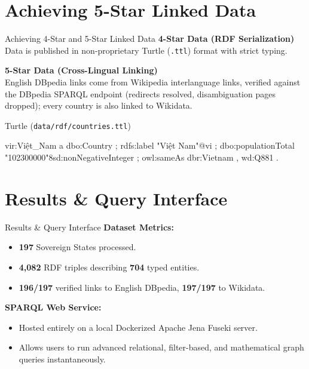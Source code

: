 \documentclass[aspectratio=169]{beamer}
\begin{document}
\section{Achieving 5-Star Linked Data}
\begin{frame}[fragile]{Achieving 4-Star and 5-Star Linked Data}
    \textbf{4-Star Data (RDF Serialization)} \\
    Data is published in non-proprietary Turtle (\texttt{.ttl}) format with strict typing.
    
    \vspace{0.3cm}
    \textbf{5-Star Data (Cross-Lingual Linking)} \\
    English DBpedia links come from Wikipedia interlanguage links, verified against the DBpedia SPARQL endpoint (redirects resolved, disambiguation pages dropped); every country is also linked to Wikidata.

    \begin{exampleblock}{Turtle (\texttt{data/rdf/countries.ttl})}
    \footnotesize
\begin{semiverbatim}
vir:Việt_Nam a dbo:Country ;
    rdfs:label "Việt Nam"@vi ;
    dbo:populationTotal "102300000"^^xsd:nonNegativeInteger ;
    owl:sameAs dbr:Vietnam , wd:Q881 .
\end{semiverbatim}
    \end{exampleblock}
\end{frame}

\section{Results \& Query Interface}
\begin{frame}{Results \& Query Interface}
    \textbf{Dataset Metrics:}
    \begin{itemize}
        \item \textbf{197} Sovereign States processed.
        \item \textbf{4,082} RDF triples describing \textbf{704} typed entities.
        \item \textbf{196/197} verified links to English DBpedia, \textbf{197/197} to Wikidata.
    \end{itemize}
    
    \vspace{0.3cm}
    \textbf{SPARQL Web Service:}
    \begin{itemize}
        \item Hosted entirely on a local Dockerized Apache Jena Fuseki server.
        \item Allows users to run advanced relational, filter-based, and mathematical graph queries instantaneously.
    \end{itemize}
\end{frame}
\end{document}
